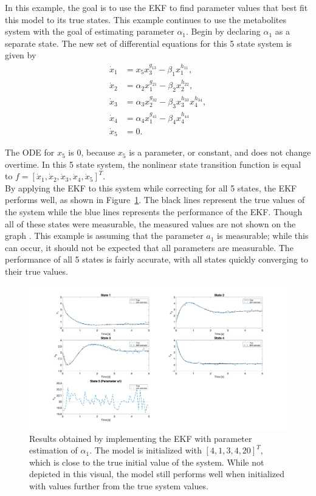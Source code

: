 \noindent In this example, the goal is to use the EKF to find parameter values that best fit this model to its true states. This example continues to use the metabolites system with the goal of estimating parameter $\alpha_1$. Begin by declaring $\alpha_1$ as a separate state. The new set of differential equations for this 5 state system is given by
\begin{align*}
\dot x_1 &= x_5 x_3^{g_{13}} - \beta_1 x_1^{h_{11}}, \\
\dot x_2 &= \alpha_2 x_1^{g_{21}} - \beta_2 x_2^{h_{22}}, \\
\dot x_3 &= \alpha_3 x_2^{g_{32}} - \beta_3 x_3^{h_{33}} x_4^{h_{34}}, \\
\dot x_4 &= \alpha_4  x_1^{g_{41}} - \beta_4 x_4^{h_{44}}\\
\dot x_5 &= 0.
\end{align*}


\noindent The ODE for $x_5$ is 0, because $x_5$ is a parameter, or constant, and does not change overtime. In this 5 state system, the nonlinear state transition function is equal to $f = [\dot x_1, \dot x_2, \dot x_3, \dot x_4, \dot x_5]^T$. \\


\noindent By applying the EKF to this system while correcting for all 5 states, the EKF performs well, as shown in Figure~\ref{fig:EKF_1param}. The black lines represent the true values of the system while the blue lines represents the performance of the EKF. Though all of these states were measurable, the measured values are not shown on the graph . This example is assuming that the parameter $a_1$ is measurable; while this can occur, it should not be expected that all parameters are measurable. The performance of all 5 states is fairly accurate, with all states quickly converging to their true values. \\

\newpage

\begin{figure}[h]
    \centering
    \includegraphics[scale = 0.3]{EKF_1param.png}
    \caption{Results obtained by implementing the EKF with parameter estimation of $\alpha_1$. The model is initialized with $[4, 1, 3, 4, 20]^T$, which is close to the true initial value of the system. While not depicted in this visual, the model still performs well when initialized with values further from the true system values. }
    \label{fig:EKF_1param}
\end{figure}



